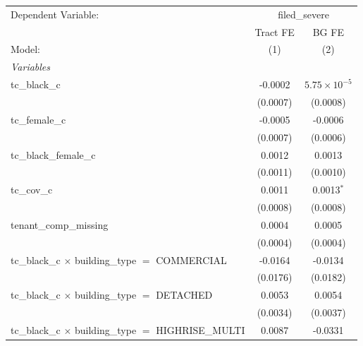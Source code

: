 \begin{tabular}{lcc}
   \tabularnewline \midrule \midrule
   Dependent Variable: & \multicolumn{2}{c}{filed\_severe}\\
                                                                       & Tract FE       & BG FE \\   
   Model:                                                              & (1)            & (2)\\  
   \midrule
   \emph{Variables}\\
   tc\_black\_c                                                        & -0.0002        & $5.75\times 10^{-5}$\\    
                                                                       & (0.0007)       & (0.0008)\\   
   tc\_female\_c                                                       & -0.0005        & -0.0006\\   
                                                                       & (0.0007)       & (0.0006)\\   
   tc\_black\_female\_c                                                & 0.0012         & 0.0013\\   
                                                                       & (0.0011)       & (0.0010)\\   
   tc\_cov\_c                                                          & 0.0011         & 0.0013$^{*}$\\   
                                                                       & (0.0008)       & (0.0008)\\   
   tenant\_comp\_missing                                               & 0.0004         & 0.0005\\   
                                                                       & (0.0004)       & (0.0004)\\   
   tc\_black\_c $\times$ building\_type $=$ COMMERCIAL                 & -0.0164        & -0.0134\\   
                                                                       & (0.0176)       & (0.0182)\\   
   tc\_black\_c $\times$ building\_type $=$ DETACHED                   & 0.0053         & 0.0054\\   
                                                                       & (0.0034)       & (0.0037)\\   
   tc\_black\_c $\times$ building\_type $=$ HIGHRISE\_MULTI            & 0.0087         & -0.0331\\   

\end{tabular}
